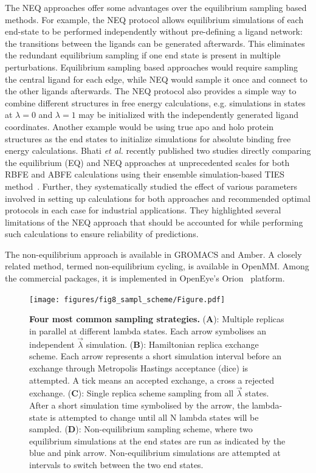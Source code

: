 \documentclass[9pt,bestpractices]{livecoms}
\begin{document}
The NEQ approaches offer some advantages over the equilibrium sampling based methods. For example, the NEQ protocol allows equilibrium simulations of each end-state to be performed independently without pre-defining a ligand network: the transitions between the ligands can be generated afterwards. This eliminates the redundant equilibrium sampling if one end state is present in multiple perturbations. Equilibrium sampling based approaches would require sampling the central ligand for each edge, while NEQ would sample it once and connect to the other ligands afterwards. The NEQ protocol also provides a simple way to combine different structures in free energy calculations, e.g. simulations in states at $\lambda=0$ and $\lambda=1$ may be initialized with the independently generated ligand coordinates. Another example would be using true apo and holo protein structures as the end states to initialize simulations for absolute binding free energy calculations. 
Bhati \textit{et al.} recently published two studies directly comparing the equilibrium (EQ) and NEQ approaches at unprecedented scales for both RBFE and ABFE calculations using their ensemble simulation-based TIES method~\cite{wan2023eqvsneq, bhati2025}. Further, they systematically studied the effect of various parameters involved in setting up calculations for both approaches and recommended optimal protocols in each case for industrial applications. They highlighted several limitations of the NEQ approach that should be accounted for while performing such calculations to ensure reliability of predictions.

The non-equilibrium approach is available in GROMACS and Amber. A closely related method, termed non-equilibrium cycling, is available in OpenMM. Among the commercial packages, it is implemented in OpenEye's Orion{\textregistered}~\cite{sorensen2024orion} platform.

\begin{figure}
    \texttt{[image: figures/fig8\_sampl\_scheme/Figure.pdf]}
    \caption{\textbf{Four most common sampling strategies.} (\textbf{A}): Multiple replicas in parallel at different lambda states. Each arrow symbolises an independent $\vec{\lambda}$ simulation. (\textbf{B}): Hamiltonian replica exchange scheme. Each arrow represents a short simulation interval before an exchange through Metropolis Hastings acceptance (dice) is attempted. A tick means an accepted exchange, a cross a rejected exchange. (\textbf{C}): Single replica scheme sampling from all $\vec{\lambda}$ states. After a short simulation time symbolised by the arrow, the lambda-state is attempted to change until all N lambda states will be sampled. (\textbf{D}): Non-equilibrium sampling scheme, where two equilibrium simulations at the end states are run as indicated by the blue and pink arrow. Non-equilibrium simulations are attempted at intervals to switch between the two end states.}
    \label{fig:fig_sampling_scheme}
\end{figure} 
\end{document}
